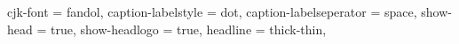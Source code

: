 {{      %
    cjk-font = fandol,
    caption-labelstyle = dot,
    caption-labelseperator = space,
    show-head = true,
    show-headlogo = true,
    headline = thick-thin,
}}
